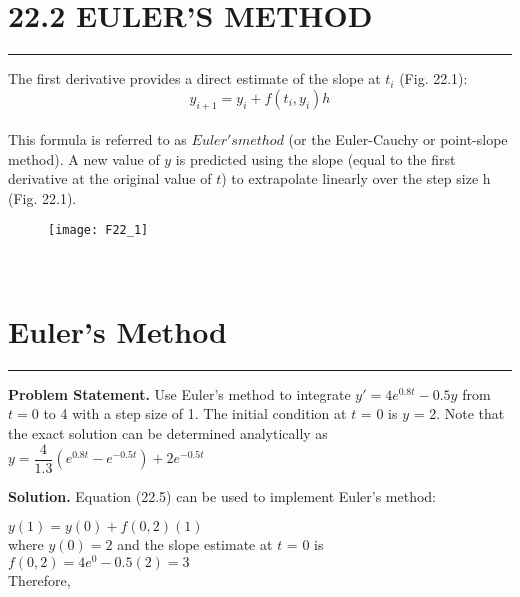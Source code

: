 \documentclass[../main.tex]{subfiles}
\begin{document}
\vspace{0,6in}
\section{22.2 EULER'S METHOD}
\vspace{0,1in}
\hrule
\vspace{0,1in}
The first derivative provides a direct estimate of the slope at $t_{i}$ (Fig. 22.1):
\begin{equation}
\tag{22.5}
y_{i+1} = y_{i} + f(t_{i},y_{i})h
\end{equation}\\
This formula is referred to as $Euler's method$ (or the Euler-Cauchy or point-slope method).
A new value of $y$ is predicted using the slope (equal to the first derivative at the original
value of $t$) to extrapolate linearly over the step size h (Fig. 22.1).\\
\begin{figure}[hbt!]
	\texttt{[image: F22\_1]}
	\label{F 22.1}
\end{figure}\\

\vspace{0,3in}
\section{Euler's Method}
\vspace{0,1in}
\hrule
\vspace{0,1in}
\textbf{Problem Statement.} Use Euler's method to integrate $y' = 4e^{0.8t} - 0.5y$ from $t = 0$ to 4 with a step size of 1. The initial condition at $t$ = 0 is $y$ = 2. Note that the exact solution can
be determined analytically as\\

$y= \dfrac{4}{1.3} (e^{0.8t} - e^{-0.5t}) + 2e^{-0.5t} $

\vspace{0.2in}
\textbf{Solution.} Equation (22.5) can be used to implement Euler's method:

$y(1) = y(0) + f(0,2)(1)$\\

where $y(0) = 2$ and the slope estimate at $t$ = 0 is\\

$f(0,2) = 4e^0 - 0.5(2) = 3$\\

Therefore,\\
\end{document}
